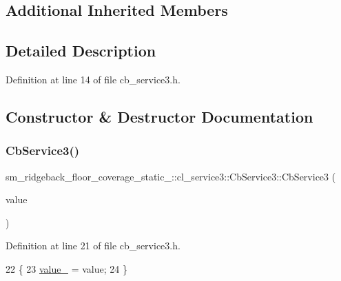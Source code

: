 \subsection*{Additional Inherited Members}


\subsection{Detailed Description}


Definition at line 14 of file cb\+\_\+service3.\+h.



\subsection{Constructor \& Destructor Documentation}
\mbox{\label{classsm__ridgeback__floor__coverage__static__1_1_1cl__service3_1_1CbService3_a68bc48acd63a5f06972d70b002dd756f}} 
\subsubsection{\texorpdfstring{Cb\+Service3()}{CbService3()}}
{\footnotesize\ttfamily sm\+\_\+ridgeback\+\_\+floor\+\_\+coverage\+\_\+static\+\_\+::cl\+\_\+service3\+::\+Cb\+Service3\+::\+Cb\+Service3 (\begin{DoxyParamCaption}\item[{\hyperlink{namespacesm__ridgeback__floor__coverage__static__1_1_1cl__service3_aaba74bbc34b595ed42909975cedd5961}{Service3\+Command}}]{value }\end{DoxyParamCaption})\hspace{0.3cm}{\ttfamily [inline]}}



Definition at line 21 of file cb\+\_\+service3.\+h.


\begin{DoxyCode}
22   \{
23     \hyperlink{classsm__ridgeback__floor__coverage__static__1_1_1cl__service3_1_1CbService3_a845615b00a06fa3d08fff04282572348}{value\_} = value;
24   \}
\end{DoxyCode}


